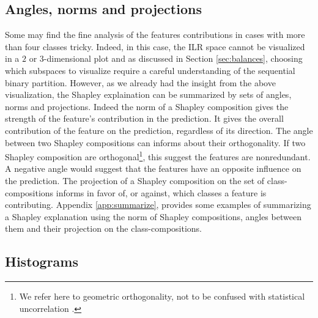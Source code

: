 \documentclass{article}
\theoremstyle{plain}
\theoremstyle{definition}
\theoremstyle{remark}
\begin{document}
\subsection{Angles, norms and projections}

Some may find the fine analysis of the features contributions in cases with more than four classes tricky. Indeed, in this case, the ILR space cannot be visualized in a $2$ or $3$-dimensional plot and as discussed in Section \ref{sec:balances}, choosing which subspaces to visualize require a careful understanding of the sequential binary partition. However, as we already had the insight from the above visualization, the Shapley explaination can be summarized by sets of angles, norms and projections. Indeed the norm of a Shapley composition gives the strength of the feature's contribution in the prediction. It gives the overall contribution of the feature on the prediction, regardless of its direction. The angle between two Shapley compositions can informs about their orthogonality. If two Shapley composition are orthogonal\footnote{We refer here to geometric orthogonality, not to be confused with statistical uncorrelation \cite{pawlowskymodeling}.}, this suggest the features are nonredundant. A negative angle would suggest that the features have an opposite influence on the prediction. The projection of a Shapley composition on the set of class-compositions informs in favor of, or against, which classes a feature is contributing. Appendix \ref{app:summarize}, provides some examples of summarizing a Shapley explanation using the norm of Shapley compositions, angles between them and their projection on the class-compositions.

\subsection{Histograms}
\end{document}

